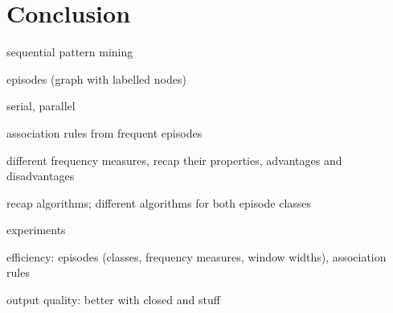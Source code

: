\chapter{Conclusion}

sequential pattern mining

episodes (graph with labelled nodes)

serial, parallel

association rules from frequent episodes

different frequency measures, recap their properties, advantages and disadvantages

recap algorithms; different algorithms for both episode classes

experiments

efficiency: episodes (classes, frequency measures, window widths), association rules

output quality: better with closed and stuff
